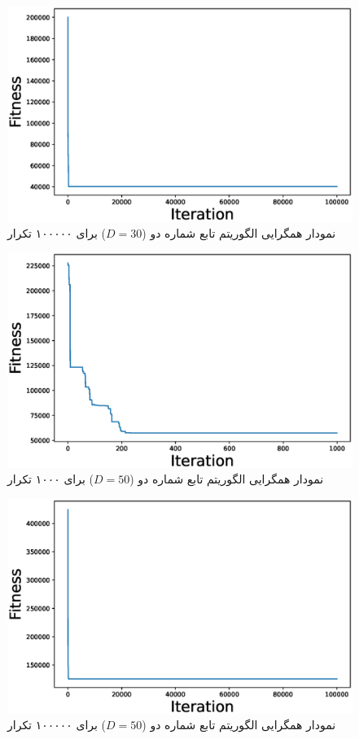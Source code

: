  \begin{figure}[H]
	\caption{نمودار همگرایی الگوریتم  تابع شماره دو ($D=30$) برای ۱۰۰۰۰۰ تکرار } 
	\centering 
	\includegraphics[width=16cm]{../Figure/Q1/PSO_II_convergence_curve_30_ite_100000} 
\end{figure}

 \begin{figure}[H]
	\caption{نمودار همگرایی الگوریتم  تابع شماره دو ($D=50$) برای ۱۰۰۰ تکرار } 
	\centering 
	\includegraphics[width=16cm]{../Figure/Q1/PSO_II_convergence_curve_50_ite_1000} 
\end{figure}

 \begin{figure}[H]
	\caption{نمودار همگرایی الگوریتم  تابع شماره دو ($D=50$) برای ۱۰۰۰۰۰ تکرار } 
	\centering 
	\includegraphics[width=16cm]{../Figure/Q1/PSO_II_convergence_curve_50_ite_100000} 
\end{figure}


